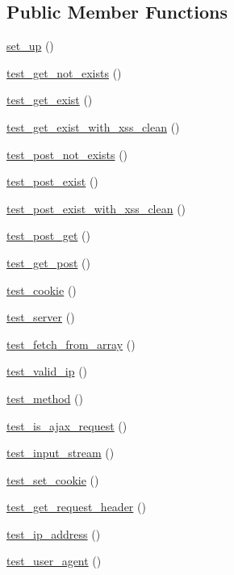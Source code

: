 \subsection*{Public Member Functions}
\begin{DoxyCompactItemize}
\item 
\hyperlink{class_input__test_a69829875c8d4b6ce94908445c4155741}{set\+\_\+up} ()
\item 
\hyperlink{class_input__test_a3d0ccaa75b45925a048155d3f0fb2c6c}{test\+\_\+get\+\_\+not\+\_\+exists} ()
\item 
\hyperlink{class_input__test_adfac9c8f9f24c6658ed826e6af3ec526}{test\+\_\+get\+\_\+exist} ()
\item 
\hyperlink{class_input__test_a3fc7333b5c60d433173f37d04157b18d}{test\+\_\+get\+\_\+exist\+\_\+with\+\_\+xss\+\_\+clean} ()
\item 
\hyperlink{class_input__test_a90cc7a2579c4cec3496c3401da04509b}{test\+\_\+post\+\_\+not\+\_\+exists} ()
\item 
\hyperlink{class_input__test_a21d72e558a74165313d6aa7728af6368}{test\+\_\+post\+\_\+exist} ()
\item 
\hyperlink{class_input__test_a05060b742e901c4c09b04d93c7a7e29e}{test\+\_\+post\+\_\+exist\+\_\+with\+\_\+xss\+\_\+clean} ()
\item 
\hyperlink{class_input__test_abee01fed352d3d5e31bf19adef368367}{test\+\_\+post\+\_\+get} ()
\item 
\hyperlink{class_input__test_ac890b79ea624eba8a54b28f28a01a06c}{test\+\_\+get\+\_\+post} ()
\item 
\hyperlink{class_input__test_a5566af33a173925d6f7297987c3b7072}{test\+\_\+cookie} ()
\item 
\hyperlink{class_input__test_a5fdb5cb9a08a7933dd607dfc4df5f231}{test\+\_\+server} ()
\item 
\hyperlink{class_input__test_a679135c27232a41cef04aa9a3c4a6b8a}{test\+\_\+fetch\+\_\+from\+\_\+array} ()
\item 
\hyperlink{class_input__test_a6bc88c1ba7169fc927dca2d037fd4f3d}{test\+\_\+valid\+\_\+ip} ()
\item 
\hyperlink{class_input__test_a50df187614626639a8af873337f56766}{test\+\_\+method} ()
\item 
\hyperlink{class_input__test_a3eb2b45152cf48d1f3e1c9c3d1a2c958}{test\+\_\+is\+\_\+ajax\+\_\+request} ()
\item 
\hyperlink{class_input__test_af301317aea2b99a22fbdc2d0eb19f39b}{test\+\_\+input\+\_\+stream} ()
\item 
\hyperlink{class_input__test_a53713095e92d6bdf3a7ed5c65628a73c}{test\+\_\+set\+\_\+cookie} ()
\item 
\hyperlink{class_input__test_a922ca0b17dab12203350dd165389f479}{test\+\_\+get\+\_\+request\+\_\+header} ()
\item 
\hyperlink{class_input__test_a4c4dcbb50d70f5f84422dcf8319a1d70}{test\+\_\+ip\+\_\+address} ()
\item 
\hyperlink{class_input__test_af741f6d5257b2d929ae050d6e7172a65}{test\+\_\+user\+\_\+agent} ()
\end{DoxyCompactItemize}
